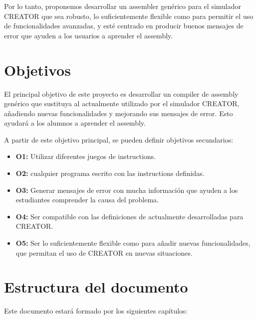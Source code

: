 Por lo tanto, proponemos desarrollar un \gls{assembler} genérico para el simulador
CREATOR que sea robusto, lo suficientemente flexible como para permitir el uso
de funcionalidades avanzadas, y esté centrado en producir buenos mensajes de
error que ayuden a los usuarios a aprender el \gls{assembly}.

\section{Objetivos}\label{sec:objectives}

El principal objetivo de este proyecto es desarrollar un \gls{compiler} de
\gls{assembly}  genérico que sustituya al actualmente utilizado por el simulador
CREATOR, añadiendo nuevas funcionalidades y mejorando sus mensajes de error.
Esto ayudará a los alumnos a aprender el \gls{assembly}.

\noindent
A partir de este objetivo principal, se pueden definir objetivos secundarios:

\begin{itemize}
    \item \textbf{O1:} Utilizar diferentes juegos de \glspl{instruction}.
    \item \textbf{O2:}  cualquier programa
     escrito con las \glspl{instruction}
    definidas.
    \item \textbf{O3:} Generar mensajes de error con mucha información que
    ayuden a los estudiantes comprender la causa del problema.
    \item \textbf{O4:} Ser compatible con las definiciones de
     actualmente desarrolladas para CREATOR.
    \item \textbf{O5:} Ser lo suficientemente flexible como para añadir nuevas
    funcionalidades, que permitan el uso de CREATOR en nuevas situaciones.
\end{itemize}

\section{Estructura del documento}\label{sec:structure}

Este documento estará formado por los siguientes capítulos:

